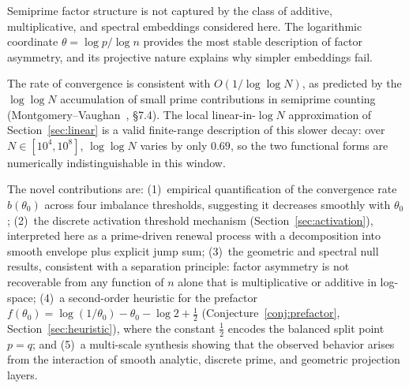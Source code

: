 \documentclass[11pt]{article}
\theoremstyle{definition}
\begin{document}
Semiprime factor structure is not captured by the class of additive, multiplicative,
and spectral embeddings considered here.  The logarithmic coordinate
\(\theta = \log p / \log n\) provides the most stable description of factor asymmetry,
and its projective nature explains why simpler embeddings fail.

The rate of convergence is consistent with \(O(1/\!\log\log N)\), as predicted by the
\(\log\log N\) accumulation of small prime contributions in semiprime counting
(Montgomery--Vaughan~\cite{montgomery2007}, \S7.4).  The local linear-in-\(\log N\)
approximation of Section~\ref{sec:linear} is a valid finite-range description of this
slower decay: over \(N \in [10^4, 10^8]\), \(\log\log N\) varies by only \(0.69\),
so the two functional forms are numerically indistinguishable in this window.

The novel contributions are:
(1)~empirical quantification of the convergence rate \(b(\theta_0)\) across four
imbalance thresholds, suggesting it decreases smoothly with \(\theta_0\);
(2)~the discrete activation threshold mechanism (Section~\ref{sec:activation}),
interpreted here as a prime-driven renewal process with a decomposition into smooth
envelope plus explicit jump sum;
(3)~the geometric and spectral null results, consistent with a separation principle:
factor asymmetry is not recoverable from any function of \(n\) alone that is
multiplicative or additive in log-space;
(4)~a second-order heuristic for the prefactor
\(f(\theta_0) = \log(1/\theta_0) - \theta_0 - \log 2 + \tfrac{1}{2}\)
(Conjecture~\ref{conj:prefactor}, Section~\ref{sec:heuristic}), where the constant
\(\tfrac{1}{2}\) encodes the balanced split point \(p = q\); and
(5)~a multi-scale synthesis showing that the observed behavior arises from the
interaction of smooth analytic, discrete prime, and geometric projection layers.
\end{document}
